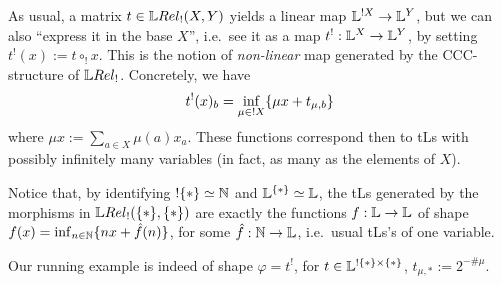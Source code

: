 

 As usual, a matrix $t\in\HOM{\LREL_!}{X}{Y}$ yields a linear map $\mathbb{L}^{!X}\to\mathbb{L}^Y$, but we can also ``express it in the base $X$'', i.e.\ see it as a map $t^!:\mathbb{L}^X\to\mathbb{L}^Y$, by setting 
 $t^!(x):=t\circ_! x$.
 This is the notion of \emph{non-linear} map generated by the CCC-structure of $\LREL_!$.
 Concretely, we have
 \begin{equation}
 t^!(x)_b=\inf\limits_{\mu\in !X} \{\mu x+ t_{\mu,b}\}
 \end{equation}
 where $\mu x:=\sum\limits_{a\in X} \mu(a)x_a$.
 These functions correspond then to tLs with possibly infinitely many variables (in fact, as many as the elements of $X$). %
 
% 
%

Notice that, by identifying $!\{*\}\simeq \mathbb{N}$ and $\mathbb{L}^{\{*\}}\simeq\mathbb{L}$, the tLs generated by the morphisms in $\HOM{\LREL_!}{\set{*}}{\set{*}}$ are exactly the functions $f:\mathbb{L}\to\mathbb{L}$ of shape $f(x)=\inf_{n\in\mathbb{N}}\{nx+\hat{f}(n)\}$, for some $\hat{f}:\mathbb{N}\to\mathbb{L}$, i.e.\ usual tLs's of one variable.
 \begin{remark}
 Our running example is indeed of shape $\varphi=t^!$, for $t\in\mathbb{L}^{!\{*\}\times\{*\}}$, $t_{\mu,*}:=2^{-\# \mu}$.
\end{remark}



